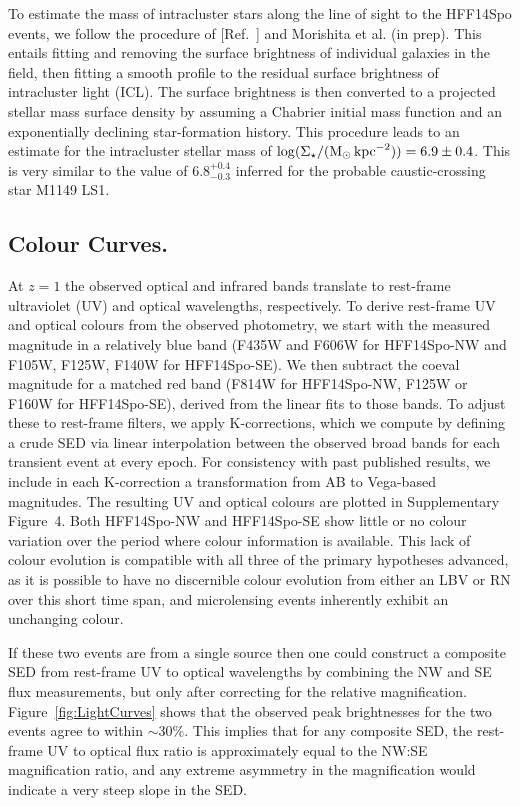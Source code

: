 \documentclass{article}
\newcommand{\citeref}[1]{[Ref.~{\citenum{#1}}]}
\providecommand\citep{\cite}
\def\Msun{\mbox{M$_{\odot}$}\xspace}
\def\spock{HFF14Spo\xspace}
\def\spockone{HFF14Spo-NW\xspace}
\def\spocktwo{HFF14Spo-SE\xspace}
\begin{document}
To estimate the mass of intracluster stars along the line of sight to
the \spock events, we follow the procedure of \citeref{Kelly:2017} and
Morishita et al. (in prep).  This entails fitting and removing the
surface brightness of individual galaxies in the field, then fitting a
smooth profile to the residual surface brightness of intracluster
light (ICL).  The surface brightness is then converted to a projected
stellar mass surface density by assuming a
Chabrier\cite{Chabrier:2003} initial mass function and an
exponentially declining star-formation history.  This procedure leads
to an estimate for the intracluster stellar mass of $\log
(\Sigma_{\star} / (\Msun\,{\rm kpc}^{-2})) = 6.9\pm0.4$.  This is
very similar to the value of $6.8^{+0.4}_{-0.3}$ inferred for the
probable caustic-crossing star M1149 LS1\cite{Kelly:2017}.


\subsection{Colour Curves.}\label{sec:ColorCurves}

At $z=1$ the observed optical and infrared bands translate to
rest-frame ultraviolet (UV) and optical wavelengths, respectively.  To
derive rest-frame UV and optical colours from the observed photometry,
we start with the measured magnitude in a relatively blue band (F435W
and F606W for \spockone and F105W, F125W, F140W for \spocktwo).  We
then subtract the coeval magnitude for a matched red band (F814W for
\spockone, F125W or F160W for \spocktwo), derived from the linear fits
to those bands.  To adjust these to rest-frame filters, we apply 
K-corrections\citep{Hogg:2002}, which we compute by
defining a crude SED via linear interpolation between the observed
broad bands for each transient event at every epoch.  For consistency
with past published results, we include in each K-correction a
transformation from AB to Vega-based magnitudes.  The resulting UV and
optical colours are plotted in Supplementary Figure~4.  Both
\spockone and \spocktwo show little or no colour variation over the
period where colour information is available.  This lack of colour
evolution is compatible with all three of the primary hypotheses
advanced, as it is possible to have no discernible colour evolution
from either an LBV or RN over this short time span, and microlensing
events inherently exhibit an unchanging colour.

If these two events are from a single source then one could construct
a composite SED from rest-frame UV to optical wavelengths by combining
the NW and SE flux measurements, but only after correcting for the
relative magnification.  Figure~\ref{fig:LightCurves}
shows that the observed peak brightnesses for the two events agree to
within $\sim30\%$.  This implies that for any composite SED, the
rest-frame UV to optical flux ratio is approximately equal to the
NW:SE magnification ratio, and any extreme asymmetry in the
magnification would indicate a very steep slope in the SED.
\end{document}
